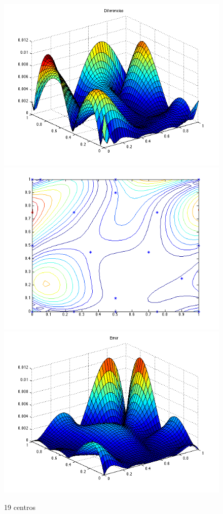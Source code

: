 \documentclass[11pt,a4paper]{article}
\begin{document}
\begin{figure}[H]
\centering

\includegraphics[scale=0.35]{diferencias19.png}
\includegraphics[scale=0.35]{centros19.png}
\includegraphics[scale=0.35]{error19.png}
\caption{19 centros}
\end{figure}
\end{document}
